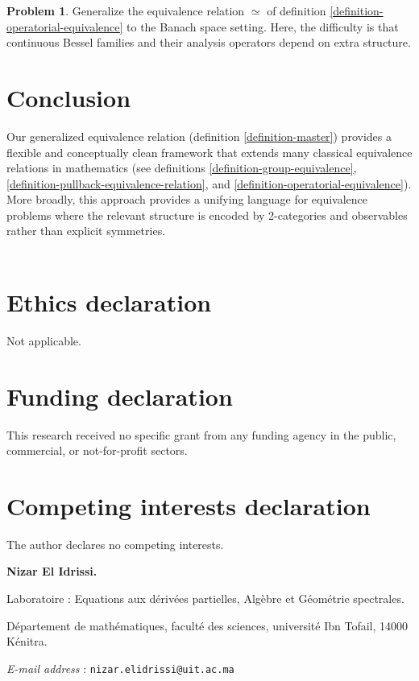 \documentclass[a4paper,10pt]{article}
\makeatletter
\theoremstyle{plain}
\theoremstyle{definition}
\newtheorem{problem}[theorem]{Problem}
\theoremstyle{remark}
\newcommand{\Addresses}{{%
  \bigskip
  \footnotesize

  \textbf{Nizar El Idrissi.}
  \par\nopagebreak Laboratoire : Equations aux dérivées partielles, Algèbre et Géométrie spectrales.
  \par\nopagebreak
  Département de mathématiques, faculté des sciences, université Ibn Tofail, 14000 Kénitra.\par\nopagebreak 
  \textit{E-mail address} : \texttt{nizar.elidrissi@uit.ac.ma}
  
%  

}}
\makeatother
\begin{document}
\begin{problem}
Generalize the equivalence relation $\simeq$ of definition \ref{definition-operatorial-equivalence} to the Banach space setting. Here, the difficulty is that continuous Bessel families and their analysis operators depend on extra structure. 
\end{problem}



\section{Conclusion}
\label{section-conclusion}

Our generalized equivalence relation (definition \ref{definition-master}) provides a flexible and conceptually clean framework that extends many classical equivalence relations in mathematics (see definitions \ref{definition-group-equivalence}, \ref{definition-pullback-equivalence-relation}, and \ref{definition-operatorial-equivalence}). \\
More broadly, this approach provides a unifying language for equivalence problems where the relevant structure is encoded by 2-categories and observables rather than explicit symmetries. \\ \\

\section*{Ethics declaration}
Not applicable.

\section*{Funding declaration}
This research received no specific grant from any funding agency in the public, commercial, or not-for-profit sectors.

\section*{Competing interests declaration}
The author declares no competing interests.

\nocite{*} %



\Addresses
\end{document}
